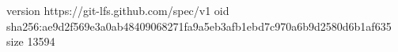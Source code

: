 version https://git-lfs.github.com/spec/v1
oid sha256:ae9d2f569e3a0ab48409068271fa9a5eb3afb1ebd7c970a6b9d2580d6b1af635
size 13594
